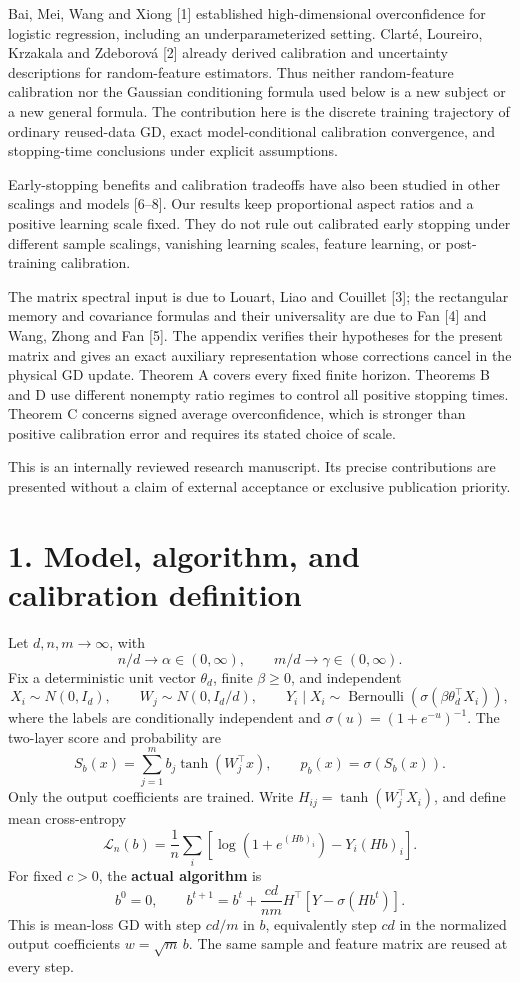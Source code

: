 \documentclass[
  11pt,
  a4paper,
]{article}
\begin{document}
Bai, Mei, Wang and Xiong {[}1{]} established high-dimensional
overconfidence for logistic regression, including an underparameterized
setting. Clarté, Loureiro, Krzakala and Zdeborová {[}2{]} already
derived calibration and uncertainty descriptions for random-feature
estimators. Thus neither random-feature calibration nor the Gaussian
conditioning formula used below is a new subject or a new general
formula. The contribution here is the discrete training
trajectory of ordinary reused-data GD, exact model-conditional
calibration convergence, and stopping-time conclusions under explicit
assumptions.

Early-stopping benefits and calibration tradeoffs have also been studied
in other scalings and models {[}6--8{]}. Our results keep proportional
aspect ratios and a positive learning scale fixed. They do not rule out
calibrated early stopping under different sample scalings, vanishing
learning scales, feature learning, or post-training calibration.

The matrix spectral input is due to Louart, Liao and Couillet {[}3{]};
the rectangular memory and covariance formulas and their universality
are due to Fan {[}4{]} and Wang, Zhong and Fan {[}5{]}. The appendix
verifies their hypotheses for the present matrix and gives an exact
auxiliary representation whose corrections cancel in the physical GD
update. Theorem A covers every fixed finite horizon. Theorems B and D
use different nonempty ratio regimes to control all positive stopping
times. Theorem C concerns signed average overconfidence, which is
stronger than positive calibration error and requires its stated choice
of scale.

This is an internally reviewed research manuscript. Its precise
contributions are presented without a claim of external acceptance or
exclusive publication priority.

\hypertarget{model-algorithm-and-calibration-definition}{%
\section{1. Model, algorithm, and calibration
definition}\label{model-algorithm-and-calibration-definition}}

Let \(d,n,m\to\infty\), with \[
n/d\to\alpha\in(0,\infty),\qquad m/d\to\gamma\in(0,\infty).
\] Fix a deterministic unit vector \(\theta_d\), finite \(\beta\ge0\),
and independent \[
X_i\sim N(0,I_d),\qquad W_j\sim N(0,I_d/d),
\qquad Y_i\mid X_i\sim\operatorname{Bernoulli}(\sigma(\beta\theta_d^\top X_i)),
\] where the labels are conditionally independent and
\(\sigma(u)=(1+e^{-u})^{-1}\). The two-layer score and probability are
\[
S_b(x)=\sum_{j=1}^m b_j\tanh(W_j^\top x),\qquad p_b(x)=\sigma(S_b(x)).
\] Only the output coefficients are trained. Write
\(H_{ij}=\tanh(W_j^\top X_i)\), and define mean cross-entropy \[
\mathcal L_n(b)=\frac1n\sum_i[\log(1+e^{(Hb)_i})-Y_i(Hb)_i].
\] For fixed \(c>0\), the \textbf{actual algorithm} is \[
b^0=0,\qquad
b^{t+1}=b^t+\frac{cd}{nm}H^\top[Y-\sigma(Hb^t)]. \tag{1}
\] This is mean-loss GD with step \(cd/m\) in \(b\), equivalently step
\(cd\) in the normalized output coefficients \(w=\sqrt m\,b\). The same
sample and feature matrix are reused at every step.
\end{document}

